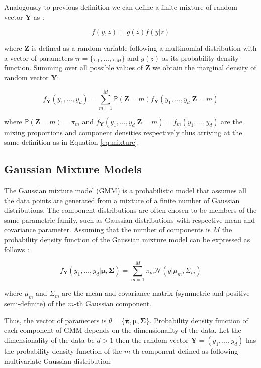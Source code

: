 Analogously to previous definition we can define a finite mixture of random vector $\textbf{Y}$ as \citep{Bishop2006}:

\begin{equation}
    f(y,z) = g(z) f(y|z)
\end{equation}

where $\textbf{Z}$ is defined as a random variable following a multinomial distribution with a vector of parameters $\boldsymbol{\pi} = \{\pi_1,\ldots,\pi_M\}$ and $g(z)$ as its 
probability density function. Summing over all possible values of $\textbf{Z}$ we obtain the marginal density of random vector $\textbf{Y}$:

\begin{equation}
    f_{\textbf{Y}}(y_1,\ldots,y_d)= \sum_{m=1}^{M} \mathbb{P}(\textbf{Z}=m) f_{\textbf{Y}}(y_1,\ldots,y_d|\textbf{Z}=m)
\end{equation}
    
where $\mathbb{P}(\textbf{Z}=m) = \pi_m$ and $f_{\textbf{Y}}(y_1,\ldots,y_d|\textbf{Z}=m) = f_m(y_1,\ldots,y_d)$ are the mixing proportions and component densities respectively thus arriving at the same definition 
as in Equation \ref{eq:mixture}.

\subsection{Gaussian Mixture Models}

The Gaussian mixture model (GMM) is a probabilistic model that assumes all the data points are generated 
from a mixture of a finite number of Gaussian distributions. The component distributions are often chosen to be members of the same parametric family,
such as Gaussian distributions with respective mean and covariance parameter. Assuming that the number of components is $M$
the probability density function of the Gaussian mixture model can be expressed as follows \citep{Bishop2006}:

\begin{equation}
    f_{\textbf{Y}}(y_1,\ldots,y_d|\boldsymbol{\mu},\boldsymbol{\Sigma}) = \sum_{m=1}^{M} \pi_m \mathcal{N}(y|\mu_m, \Sigma_m)
\end{equation}

where $\mu_m$ and $\Sigma_m$ are the mean and covariance matrix (symmetric and positive semi-definite) of the $m$-th Gaussian component. 

Thus, the vector of parameters is $\theta = \{\boldsymbol{\pi},\boldsymbol{\mu},\boldsymbol{\Sigma}\}$. Probability density function of each component of GMM depends on the dimensionality of the data.
Let the dimensionality of the data be $d>1$ then the random vector $\textbf{Y}=(y_1,\ldots,y_d)$ has the probability density function of the $m$-th component 
defined as following multivariate Gaussian distribution:

